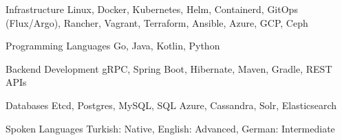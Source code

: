 
\begin{cvskills}

    \cvskill
    {Infrastructure}
    {
        Linux, Docker, Kubernetes, Helm, Containerd, GitOps (Flux/Argo),
        \newline
        Rancher, Vagrant, Terraform, Ansible, Azure, GCP, Ceph
    }

    \cvskill
    {Programming Languages}
    {Go, Java, Kotlin, Python}

    \cvskill
    {Backend Development}
    {gRPC, Spring Boot, Hibernate, Maven, Gradle, REST APIs}

    \cvskill
    {Databases}
    {Etcd, Postgres, MySQL, SQL Azure, Cassandra, Solr, Elasticsearch}

    \cvskill
    {Spoken Languages}
    {Turkish: Native, English: Advanced, German: Intermediate}

\end{cvskills}
